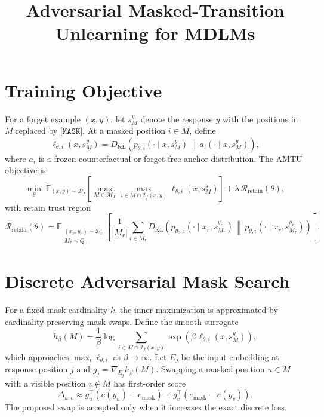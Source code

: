 \documentclass[11pt]{article}
\title{Adversarial Masked-Transition Unlearning for MDLMs}
\author{}
\date{}
\newcommand{\Df}{\mathcal{D}_{f}}
\newcommand{\Dr}{\mathcal{D}_{r}}
\newcommand{\Iforget}{\mathcal{I}_{f}}
\newcommand{\Mset}{\mathcal{M}_{\Gamma}}
\newcommand{\KL}{D_{\mathrm{KL}}}
\newcommand{\Mask}{\texttt{[MASK]}}
\begin{document}
\maketitle

\section{Training Objective}

For a forget example $(x,y)$, let $s_M^y$ denote the response $y$ with the
positions in $M$ replaced by $\Mask$.  At a masked position $i\in M$, define
\begin{equation}
    \ell_{\theta,i}(x,s_M^y)
    =
    \KL\!\left(
        p_{\theta,i}(\cdot\mid x,s_M^y)
        \,\middle\|\,
        a_i(\cdot\mid x,s_M^y)
    \right),
    \label{eq:local-kl}
\end{equation}
where $a_i$ is a frozen counterfactual or forget-free anchor distribution.
The AMTU objective is
\begin{equation}
\min_{\theta}\;
\mathbb{E}_{(x,y)\sim\Df}
\left[
    \max_{M\in\Mset}
    \max_{i\in M\cap\Iforget(x,y)}
    \ell_{\theta,i}(x,s_M^y)
\right]
+
\lambda\,\mathcal{R}_{\mathrm{retain}}(\theta),
\label{eq:amtu-objective}
\end{equation}
with retain trust region
\begin{equation}
\mathcal{R}_{\mathrm{retain}}(\theta)
=
\mathbb{E}_{\substack{(x_r,y_r)\sim\Dr\\M_r\sim Q_r}}
\left[
    \frac{1}{|M_r|}
    \sum_{i\in M_r}
    \KL\!\left(
        p_{\theta_0,i}(\cdot\mid x_r,s_{M_r}^{y_r})
        \,\middle\|\,
        p_{\theta,i}(\cdot\mid x_r,s_{M_r}^{y_r})
    \right)
\right].
\label{eq:retain-kl}
\end{equation}

\section{Discrete Adversarial Mask Search}

For a fixed mask cardinality $k$, the inner maximization is approximated by
cardinality-preserving mask swaps.  Define the smooth surrogate
\begin{equation}
    h_{\beta}(M)
    =
    \frac{1}{\beta}
    \log
    \sum_{i\in M\cap\Iforget(x,y)}
    \exp\!\left(\beta\,\ell_{\theta,i}(x,s_M^y)\right),
    \label{eq:smooth-max}
\end{equation}
which approaches $\max_i\ell_{\theta,i}$ as $\beta\to\infty$.
Let $E_j$ be the input embedding at response position $j$ and
$g_j=\nabla_{E_j}h_\beta(M)$.  Swapping a masked position $u\in M$ with a
visible position $v\notin M$ has first-order score
\begin{equation}
\Delta_{u,v}
\approx
    g_u^{\top}\!\left(e(y_u)-e_{\mathrm{mask}}\right)
    +
    g_v^{\top}\!\left(e_{\mathrm{mask}}-e(y_v)\right).
\label{eq:swap-score}
\end{equation}
The proposed swap is accepted only when it increases the exact discrete loss.
\end{document}
